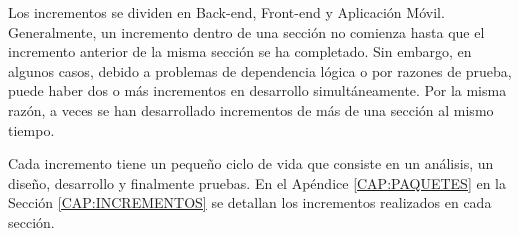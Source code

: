 Los incrementos se dividen en Back-end, Front-end y Aplicación Móvil. Generalmente, un incremento dentro de una sección no comienza hasta que el incremento anterior de la misma sección se ha completado. Sin embargo, en algunos casos, debido a problemas de dependencia lógica o por razones de prueba, puede haber dos o más incrementos en desarrollo simultáneamente. Por la misma razón, a veces se han desarrollado incrementos de más de una sección al mismo tiempo.

Cada incremento tiene un pequeño ciclo de vida que consiste en un análisis, un diseño, desarrollo y finalmente pruebas. En el Apéndice \ref{CAP:PAQUETES} en la Sección \ref{CAP:INCREMENTOS} se detallan los incrementos realizados en cada sección.